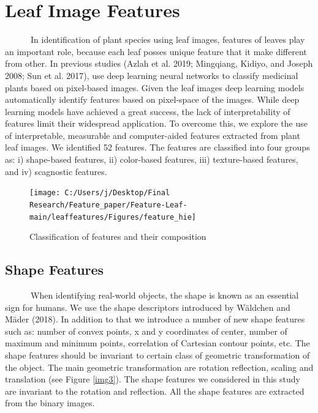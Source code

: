 \documentclass{article}
\begin{document}
\hypertarget{leaf-image-features}{%
\section{Leaf Image Features}\label{leaf-image-features}}

~~~~~~In identification of plant species using leaf images, features of
leaves play an important role, because each leaf posses unique feature
that it make different from other. In previous studies (Azlah et al.
2019; Mingqiang, Kidiyo, and Joseph 2008; Sun et al. 2017), use deep
learning neural networks to classify medicinal plants based on
pixel-based images. Given the leaf images deep learning models
automatically identify features based on pixel-space of the images.
While deep learning models have achieved a great success, the lack of
interpretability of features limit their widespread application. To
overcome this, we explore the use of interpretable, measurable and
computer-aided features extracted from plant leaf images. We identified
52 features. The features are classified into four groups as: i)
shape-based features, ii) color-based features, iii) texture-based
features, and iv) scagnostic features.

\begin{figure}[!ht]

{\centering \texttt{[image: C:/Users/j/Desktop/Final Research/Feature\_paper/Feature-Leaf-main/leaffeatures/Figures/feature\_hie]} 

}

\caption{\label{img33}Classification of features and their composition}\label{fig:unnamed-chunk-10}
\end{figure}

\hypertarget{shape-features}{%
\subsection{Shape Features}\label{shape-features}}

~~~~~~When identifying real-world objects, the shape is known as an
essential sign for humans. We use the shape descriptors introduced by
Wäldchen and Mäder (2018). In addition to that we introduce a number of
new shape features such as: number of convex points, x and y coordinates
of center, number of maximum and minimum points, correlation of
Cartesian contour points, etc. The shape features should be invariant to
certain class of geometric transformation of the object. The main
geometric transformation are rotation reflection, scaling and
translation (see Figure \ref{img3}). The shape features we considered in
this study are invariant to the rotation and reflection. All the shape
features are extracted from the binary images.
\end{document}
